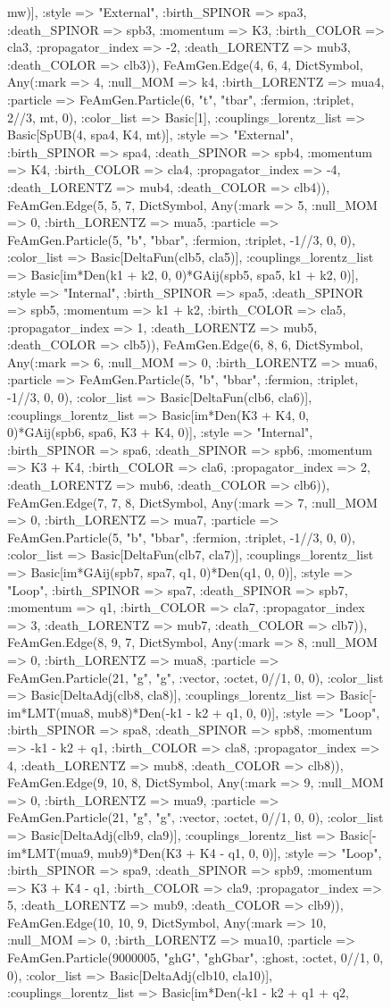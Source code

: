 \documentclass{revtex4}
\begin{document}
\begin{figure}[!htb]
\begin{center}
{mw)], :style => "External", :birth_SPINOR => spa3, :death_SPINOR => spb3, :momentum => K3, :birth_COLOR => cla3, :propagator_index => -2, :death_LORENTZ => mub3, :death_COLOR => clb3)), FeAmGen.Edge(4, 6, 4, Dict{Symbol, Any}(:mark => 4, :null_MOM => k4, :birth_LORENTZ => mua4, :particle => FeAmGen.Particle(6, "t", "tbar", :fermion, :triplet, 2//3, mt, 0), :color_list => Basic[1], :couplings_lorentz_list => Basic[SpUB(4, spa4, K4, mt)], :style => "External", :birth_SPINOR => spa4, :death_SPINOR => spb4, :momentum => K4, :birth_COLOR => cla4, :propagator_index => -4, :death_LORENTZ => mub4, :death_COLOR => clb4)), FeAmGen.Edge(5, 5, 7, Dict{Symbol, Any}(:mark => 5, :null_MOM => 0, :birth_LORENTZ => mua5, :particle => FeAmGen.Particle(5, "b", "bbar", :fermion, :triplet, -1//3, 0, 0), :color_list => Basic[DeltaFun(clb5, cla5)], :couplings_lorentz_list => Basic[im*Den(k1 + k2, 0, 0)*GAij(spb5, spa5, k1 + k2, 0)], :style => "Internal", :birth_SPINOR => spa5, :death_SPINOR => spb5, :momentum => k1 + k2, :birth_COLOR => cla5, :propagator_index => 1, :death_LORENTZ => mub5, :death_COLOR => clb5)), FeAmGen.Edge(6, 8, 6, Dict{Symbol, Any}(:mark => 6, :null_MOM => 0, :birth_LORENTZ => mua6, :particle => FeAmGen.Particle(5, "b", "bbar", :fermion, :triplet, -1//3, 0, 0), :color_list => Basic[DeltaFun(clb6, cla6)], :couplings_lorentz_list => Basic[im*Den(K3 + K4, 0, 0)*GAij(spb6, spa6, K3 + K4, 0)], :style => "Internal", :birth_SPINOR => spa6, :death_SPINOR => spb6, :momentum => K3 + K4, :birth_COLOR => cla6, :propagator_index => 2, :death_LORENTZ => mub6, :death_COLOR => clb6)), FeAmGen.Edge(7, 7, 8, Dict{Symbol, Any}(:mark => 7, :null_MOM => 0, :birth_LORENTZ => mua7, :particle => FeAmGen.Particle(5, "b", "bbar", :fermion, :triplet, -1//3, 0, 0), :color_list => Basic[DeltaFun(clb7, cla7)], :couplings_lorentz_list => Basic[im*GAij(spb7, spa7, q1, 0)*Den(q1, 0, 0)], :style => "Loop", :birth_SPINOR => spa7, :death_SPINOR => spb7, :momentum => q1, :birth_COLOR => cla7, :propagator_index => 3, :death_LORENTZ => mub7, :death_COLOR => clb7)), FeAmGen.Edge(8, 9, 7, Dict{Symbol, Any}(:mark => 8, :null_MOM => 0, :birth_LORENTZ => mua8, :particle => FeAmGen.Particle(21, "g", "g", :vector, :octet, 0//1, 0, 0), :color_list => Basic[DeltaAdj(clb8, cla8)], :couplings_lorentz_list => Basic[-im*LMT(mua8, mub8)*Den(-k1 - k2 + q1, 0, 0)], :style => "Loop", :birth_SPINOR => spa8, :death_SPINOR => spb8, :momentum => -k1 - k2 + q1, :birth_COLOR => cla8, :propagator_index => 4, :death_LORENTZ => mub8, :death_COLOR => clb8)), FeAmGen.Edge(9, 10, 8, Dict{Symbol, Any}(:mark => 9, :null_MOM => 0, :birth_LORENTZ => mua9, :particle => FeAmGen.Particle(21, "g", "g", :vector, :octet, 0//1, 0, 0), :color_list => Basic[DeltaAdj(clb9, cla9)], :couplings_lorentz_list => Basic[-im*LMT(mua9, mub9)*Den(K3 + K4 - q1, 0, 0)], :style => "Loop", :birth_SPINOR => spa9, :death_SPINOR => spb9, :momentum => K3 + K4 - q1, :birth_COLOR => cla9, :propagator_index => 5, :death_LORENTZ => mub9, :death_COLOR => clb9)), FeAmGen.Edge(10, 10, 9, Dict{Symbol, Any}(:mark => 10, :null_MOM => 0, :birth_LORENTZ => mua10, :particle => FeAmGen.Particle(9000005, "ghG", "ghGbar", :ghost, :octet, 0//1, 0, 0), :color_list => Basic[DeltaAdj(clb10, cla10)], :couplings_lorentz_list => Basic[im*Den(-k1 - k2 + q1 + q2, }
\end{center}
\end{figure}
\end{document}
